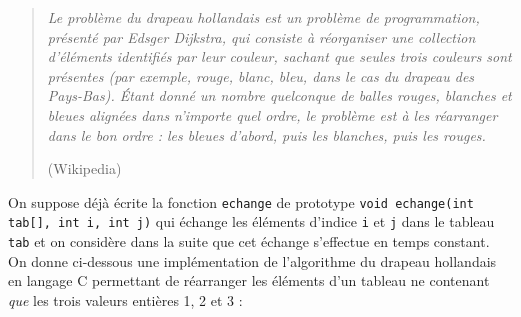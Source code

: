 \documentclass[11pt,a4paper]{article}
\begin{document}
\begin{Exercise}[title={Algorithme du drapeau hollandais}]
    \begin{quote}
    \og{} \textit{Le problème du drapeau hollandais est un problème de programmation, présenté par Edsger Dijkstra, qui consiste à réorganiser une collection d'éléments identifiés par leur couleur, sachant que seules trois couleurs sont présentes (par exemple, rouge, blanc, bleu, dans le cas du drapeau des Pays-Bas).
    Étant donné un nombre quelconque de balles rouges, blanches et bleues alignées dans n'importe quel ordre, le problème est à les réarranger dans le bon ordre : les bleues d'abord, puis les blanches, puis les rouges.}\fg{}
    \begin{flushright}
        (Wikipedia)
    \end{flushright}
    \end{quote}
    On suppose déjà écrite la fonction {\tt echange} de prototype \texttt{void echange(int tab[], int i, int j)} qui échange les éléments d'indice {\tt i} et {\tt j} dans le tableau {\tt tab} et on considère dans la suite que cet échange s'effectue en temps constant. On donne ci-dessous une implémentation de  l'algorithme du drapeau hollandais en langage C permettant de réarranger les éléments d'un tableau ne contenant \textit{que} les trois valeurs entières 1, 2 et 3  :
\end{Exercise}
\end{document}
